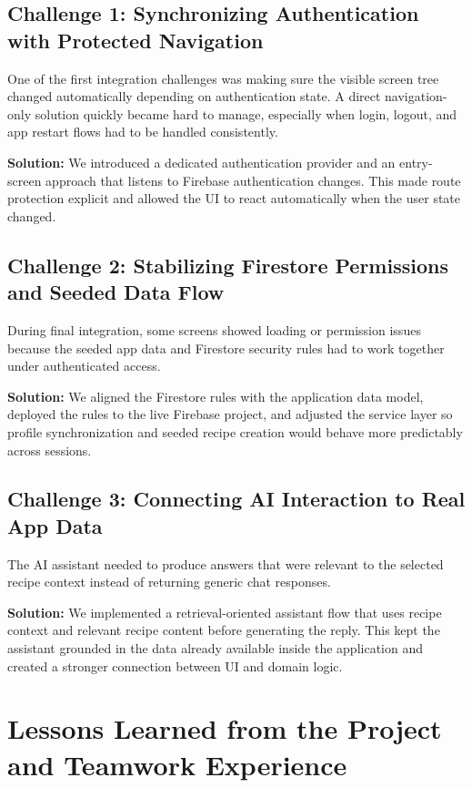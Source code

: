 \documentclass[11pt,a4paper]{article}
\begin{document}
\subsection{Challenge 1: Synchronizing Authentication with Protected Navigation}

One of the first integration challenges was making sure the visible screen tree changed automatically depending on authentication state. A direct navigation-only solution quickly became hard to manage, especially when login, logout, and app restart flows had to be handled consistently.

\textbf{Solution:} We introduced a dedicated authentication provider and an entry-screen approach that listens to Firebase authentication changes. This made route protection explicit and allowed the UI to react automatically when the user state changed.

\subsection{Challenge 2: Stabilizing Firestore Permissions and Seeded Data Flow}

During final integration, some screens showed loading or permission issues because the seeded app data and Firestore security rules had to work together under authenticated access.

\textbf{Solution:} We aligned the Firestore rules with the application data model, deployed the rules to the live Firebase project, and adjusted the service layer so profile synchronization and seeded recipe creation would behave more predictably across sessions.

\subsection{Challenge 3: Connecting AI Interaction to Real App Data}

The AI assistant needed to produce answers that were relevant to the selected recipe context instead of returning generic chat responses.

\textbf{Solution:} We implemented a retrieval-oriented assistant flow that uses recipe context and relevant recipe content before generating the reply. This kept the assistant grounded in the data already available inside the application and created a stronger connection between UI and domain logic.

\section{Lessons Learned from the Project and Teamwork Experience}
\end{document}
